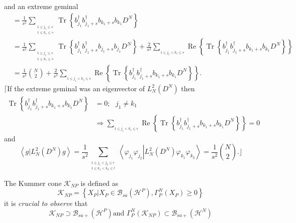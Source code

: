 \documentclass[aps,preprint]{revtex4}%
\begin{document}
and an extreme geminal
\begin{align}
&  =\frac{1}{s^{2}}\sum_{_{\substack{1\leq j_{1}\leq s\\1\leq k_{1}\leq s}%
}}\operatorname{Tr}\left\{  b_{j_{1}}^{\dagger}b_{j_{1}+s}^{\dagger}%
b_{k_{1}+s}b_{k_{1}}D^{N}\right\} \\
&  =\frac{1}{s^{2}}\sum_{_{\substack{1\leq j_{1}\leq s\\1\leq k_{1}\leq s}%
}}\operatorname{Tr}\left\{  b_{j_{1}}^{\dagger}b_{j_{1}+s}^{\dagger}%
b_{j_{1}+s}b_{j_{1}}D^{N}\right\}  +\frac{2}{s^{2}}\sum_{_{1\leq j_{1}%
<k_{1}\leq s}}\operatorname{Re}\left\{  \operatorname{Tr}\left\{  b_{j_{1}%
}^{\dagger}b_{j_{1}+s}^{\dagger}b_{k_{1}+s}b_{k_{1}}D^{N}\right\}  \right\} \\
&  =\frac{1}{s^{2}}\binom{N}{2}+\frac{2}{s^{2}}\sum_{_{1\leq j_{1}<k_{1}\leq
s}}\operatorname{Re}\left\{  \operatorname{Tr}\left\{  b_{j_{1}}^{\dagger
}b_{j_{1}+s}^{\dagger}b_{k_{1}+s}b_{k_{1}}D^{N}\right\}  \right\}  .
\end{align}
$\lceil$If the extreme geminal was an eigenvector of $L_{N}^{2}\left(
D^{N}\right)  $ then
\begin{align}
\operatorname{Tr}\left\{  b_{j_{1}}^{\dagger}b_{j_{1}+s}^{\dagger}b_{k_{1}%
+s}b_{k_{1}}D^{N}\right\}   &  =0;\text{ }j_{1}\neq k_{1}\\
&  \Rightarrow\sum_{_{1\leq j_{1}<k_{1}\leq s}}\operatorname{Re}\left\{
\operatorname{Tr}\left\{  b_{j_{1}}^{\dagger}b_{j_{1}+s}^{\dagger}b_{k_{1}%
+s}b_{k_{1}}D^{N}\right\}  \right\}  =0
\end{align}
and
\begin{equation}
\left\langle \left.  g\right\vert L_{N}^{2}\left(  D^{N}\right)
g\right\rangle =\frac{1}{s^{2}}\sum_{_{\substack{1\leq j_{1}<j_{2}\leq
r\\1\leq k_{1}<k_{2}\leq r}}}\left\langle \left.  \varphi_{j_{1}}%
\varphi_{j_{2}}\right\vert L_{N}^{2}\left(  D^{N}\right)  \varphi_{k_{1}%
}\varphi_{k_{2}}\right\rangle =\frac{1}{s^{2}}\binom{N}{2}.\rfloor
\end{equation}


The Kummer cone $\mathcal{K}_{NP}$ is defined as
\begin{equation}
\mathcal{K}_{NP}=\left\{  \left.  X_{P}\right\vert X_{P}\in\mathcal{B}%
_{sa}\left(  \mathcal{H}^{P}\right)  ,\Gamma_{P}^{N}\left(  X_{P}\right)
\geq0\right\}
\end{equation}
it is \emph{crucial to observe} that
\begin{equation}
\mathcal{K}_{NP}\supset\mathcal{B}_{sa+}\left(  \mathcal{H}^{P}\right)  \text{
and }\Gamma_{P}^{N}\left(  \mathcal{K}_{NP}\right)  \subset\mathcal{B}%
_{sa+}\left(  \mathcal{H}^{N}\right)
\end{equation}
\end{document}
